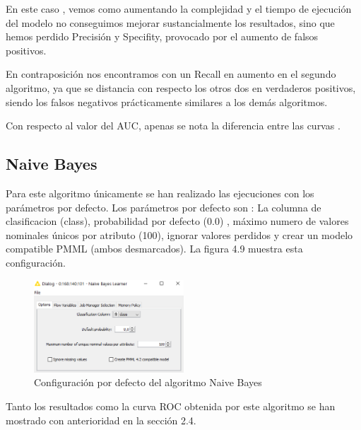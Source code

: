 	En este caso , vemos como aumentando la complejidad y el tiempo de ejecución del modelo no conseguimos mejorar sustancialmente los resultados, sino que hemos perdido Precisión y Specifity, provocado por el aumento de falsos positivos.
	
	En contraposición nos encontramos con un Recall en aumento en el segundo algoritmo, ya que se distancia con respecto los otros dos en verdaderos positivos, siendo los falsos negativos prácticamente similares a los demás algoritmos.
	
	Con respecto al valor del AUC, apenas se nota la diferencia entre las curvas .
	
	
	\subsection{Naive Bayes}
	
	Para este algoritmo únicamente se han realizado las ejecuciones con los parámetros por defecto. 
	Los parámetros por defecto son : La columna de clasificacion (class), probabilidad por defecto (0.0) , máximo numero de valores nominales únicos por atributo (100), ignorar valores perdidos y crear un modelo compatible PMML (ambos desmarcados). La figura 4.9 muestra esta configuración.
	
	\begin{figure}[htb]
		\centering
		\includegraphics[width=0.5\textwidth]{./imagenes/48}
		\caption{Configuración por defecto del algoritmo Naive Bayes} \label{fig:1}
	\end{figure}
	
	Tanto los resultados como la curva ROC obtenida por este algoritmo se han mostrado con anterioridad en la sección 2.4.
	
	
